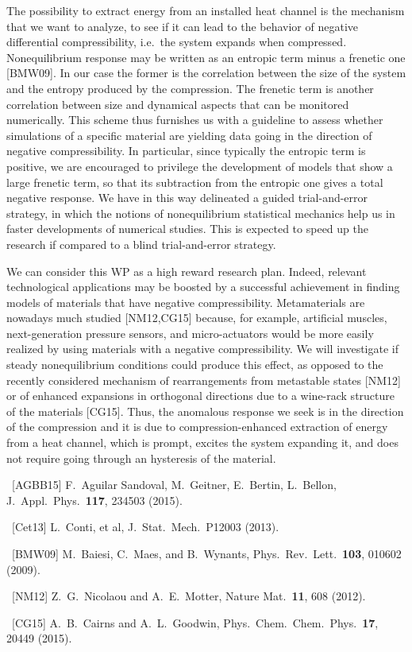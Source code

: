 \begin{workpackage}
\begin{wpdescription}
The possibility to extract energy from an installed heat channel is the mechanism that we want to
analyze, to see if it can lead to the behavior of negative differential compressibility,
i.e.~the system expands when compressed. 
Nonequilibrium response may be written as an entropic term minus a frenetic one [BMW09].
In our case the former is the correlation between the size of the system and the entropy produced by the compression.
The frenetic term is another correlation between size and dynamical aspects that can be monitored numerically.
This scheme thus furnishes us with a guideline to assess whether simulations of a specific material are yielding data 
going in the direction of negative compressibility. In particular, since typically the entropic term is positive, we
are encouraged to privilege the development of models that show a large frenetic term, so that its subtraction from
the entropic one gives a total negative response.
We have in this way delineated a guided trial-and-error strategy, in which the notions of 
nonequilibrium statistical mechanics help us in faster developments of numerical studies. This is expected to
speed up the research if compared to a blind trial-and-error strategy.


We can consider this WP as a high reward research plan. Indeed, relevant technological applications
may be boosted by a successful achievement in finding models of materials that have negative compressibility.
Metamaterials are nowadays much studied [NM12,CG15] because, for example, artificial muscles, 
next-generation pressure sensors, and micro-actuators would be
more easily realized by using materials with a negative compressibility. We will investigate
if steady nonequilibrium conditions could produce this effect, as opposed to the recently considered 
mechanism of rearrangements from metastable states [NM12] or of enhanced expansions in orthogonal directions
due to a wine-rack structure of the materials [CG15]. Thus, the anomalous response we seek is in the direction 
of the compression and it is due to compression-enhanced extraction of energy from a heat channel,
which is prompt, excites the system expanding it, 
and does not require going through an hysteresis of the material. 

\begin{compactitem}
\item ~[AGBB15] F.~Aguilar Sandoval, M.~Geitner, E.~Bertin, L.~Bellon, J.~Appl.~Phys.~{\bf 117}, 234503 (2015).
\item ~[Cet13] L.~Conti, et al, J.~Stat.~Mech.~P12003 (2013).
\item ~[BMW09]  M.~Baiesi, C.~Maes,  and B.~Wynants, Phys.~Rev.~Lett.~{\bf 103}, 010602 (2009).
\item ~[NM12] Z.~G.~Nicolaou and A.~E.~Motter, Nature Mat.~{\bf 11}, 608 (2012).
\item ~[CG15] A.~B.~Cairns and A.~L.~Goodwin, Phys.~Chem.~Chem.~Phys.~{\bf 17}, 20449 (2015).
\end{compactitem}


\end{wpdescription}
\end{workpackage}
